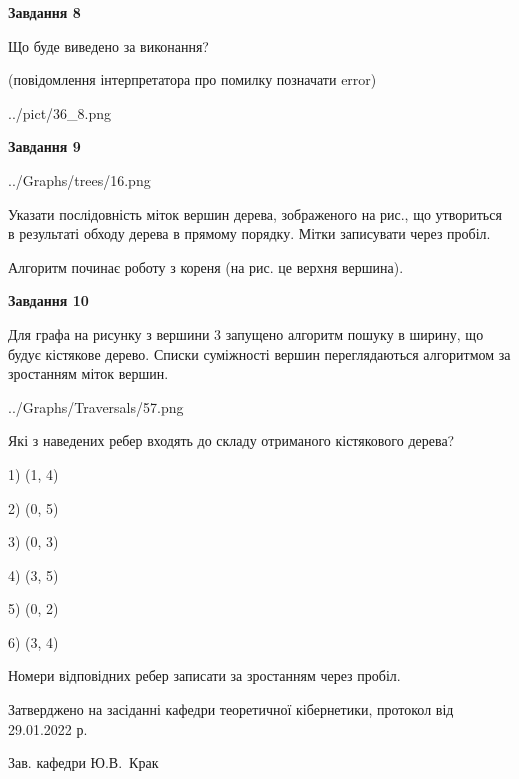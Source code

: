 \documentclass[12pt, ukrainian]{article}
\begin{document}
{\begin {large}
{\begin {center}\textbf{Завдання 8}\end {center}}\par
Що буде виведено за виконання?\par
 (повідомлення інтерпретатора про помилку позначати error)\par
\begin{center}
	{../pict/36_8.png}
\end{center}
\newpage

{\begin {center}\textbf{Завдання 9}\end {center}}\par

\begin{center}
	{../Graphs/trees/16.png}
\end{center}
Указати послідовність міток вершин дерева, зображеного на рис., що утвориться в результаті обходу дерева в прямому порядку. Мітки записувати через пробіл.\par Алгоритм починає роботу з кореня (на рис. це верхня вершина).\par
\newpage

{\begin {center}\textbf{Завдання 10}\end {center}}\par
Для графа на рисунку з вершини 3 запущено алгоритм пошуку в ширину, що будує кістякове дерево. Списки суміжності вершин переглядаються алгоритмом за зростанням міток вершин.\par
\begin{center}
	{../Graphs/Traversals/57.png}
\end{center}
\par Які з наведених ребер входять до складу отриманого кістякового дерева?\par
1) (1, 4)\par
2) (0, 5)\par
3) (0, 3)\par
4) (3, 5)\par
5) (0, 2)\par
6) (3, 4)\par
{\vskip 15pt} Номери відповідних ребер записати за зростанням через пробіл.\par
\newpage


\end {large}
}
{\smallskip \begin {small} Затверджено на засіданні кафедри теоретичної кібернетики, протокол  від   29.01.2022 р.\par\smallskip\smallskip
{\parbox {6.5 cm}{Зав. кафедри \dotfill Ю.В.~Крак}} \end{small}}
\end{document}
